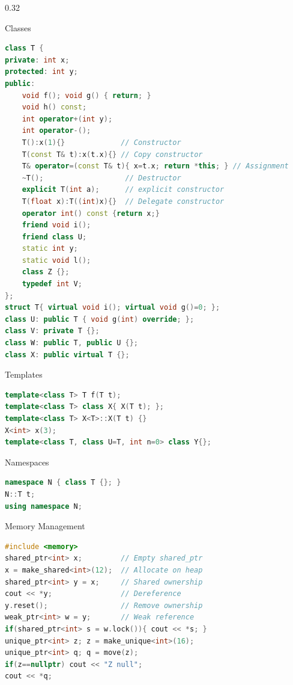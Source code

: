 \documentclass[final]{beamer}
\begin{document}
\begin{frame}[t,fragile]
\begin{columns}[t,totalwidth=\paperwidth, colsep=0.015\paperwidth]
\begin{column}{0.32\paperwidth}
\begin{block}{Classes}
\begin{lstlisting}[language=C++]
class T {
private: int x;
protected: int y;
public:
    void f(); void g() { return; }
    void h() const;
    int operator+(int y);
    int operator-();
    T():x(1){}             // Constructor
    T(const T& t):x(t.x){} // Copy constructor
    T& operator=(const T& t){ x=t.x; return *this; } // Assignment
    ~T();                   // Destructor
    explicit T(int a);      // explicit constructor
    T(float x):T((int)x){}  // Delegate constructor
    operator int() const {return x;}
    friend void i();
    friend class U;
    static int y; 
    static void l();
    class Z {}; 
    typedef int V;
};
struct T{ virtual void i(); virtual void g()=0; }; 
class U: public T { void g(int) override; };
class V: private T {};
class W: public T, public U {};
class X: public virtual T {};
\end{lstlisting}
\end{block}

\begin{block}{Templates}
\begin{lstlisting}[language=C++]
template<class T> T f(T t);
template<class T> class X{ X(T t); };
template<class T> X<T>::X(T t) {}
X<int> x(3);
template<class T, class U=T, int n=0> class Y{};
\end{lstlisting}
\end{block}

\begin{block}{Namespaces}
\begin{lstlisting}[language=C++]
namespace N { class T {}; }
N::T t;
using namespace N;
\end{lstlisting}
\end{block}

\begin{block}{Memory Management}
\begin{lstlisting}[language=C++]
#include <memory>
shared_ptr<int> x;         // Empty shared_ptr
x = make_shared<int>(12);  // Allocate on heap
shared_ptr<int> y = x;     // Shared ownership
cout << *y;                // Dereference
y.reset();                 // Remove ownership
weak_ptr<int> w = y;       // Weak reference
if(shared_ptr<int> s = w.lock()){ cout << *s; }
unique_ptr<int> z; z = make_unique<int>(16);
unique_ptr<int> q; q = move(z);
if(z==nullptr) cout << "Z null";
cout << *q;
\end{lstlisting}
\end{block}
\end{column}


\end{columns}
\end{frame}
\end{document}
